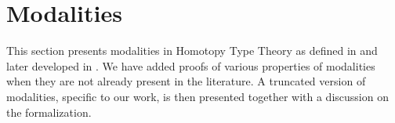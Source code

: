 \documentclass[notfinal]{jfrarticle}
\makeatletter
\def\dar[#1]#2{\ar@<-#2>[#1]\ar@<#2>[#1]} %
\def\tar[#1]#2{\ar@<#2>[#1]\ar@<0pt>[#1]\ar@<-#2>[#1]} %
\makeatother
\begin{document}






\section{Modalities}
\label{sec:modalities}

This section presents modalities in Homotopy Type Theory as defined in
\cite{hottbook} and later developed in
\cite{EPTCS158.8,shulman2015Brouwer}. We have added proofs of various
properties of modalities when they are not already present in the
literature.
A truncated version of modalities, specific to our work, is then
presented together with a discussion on the formalization.  
\end{document}
